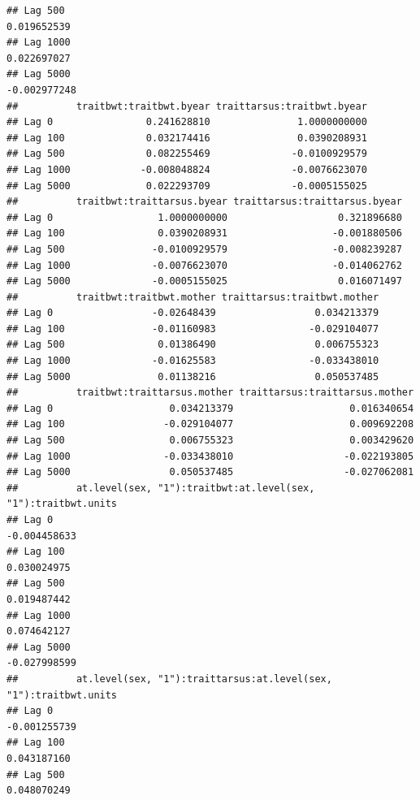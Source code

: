 \documentclass[
  12pt,
]{book}
\begin{document}
\begin{verbatim}
## Lag 500                                                           0.019652539
## Lag 1000                                                          0.022697027
## Lag 5000                                                         -0.002977248
##          traitbwt:traitbwt.byear traittarsus:traitbwt.byear
## Lag 0                0.241628810               1.0000000000
## Lag 100              0.032174416               0.0390208931
## Lag 500              0.082255469              -0.0100929579
## Lag 1000            -0.008048824              -0.0076623070
## Lag 5000             0.022293709              -0.0005155025
##          traitbwt:traittarsus.byear traittarsus:traittarsus.byear
## Lag 0                  1.0000000000                   0.321896680
## Lag 100                0.0390208931                  -0.001880506
## Lag 500               -0.0100929579                  -0.008239287
## Lag 1000              -0.0076623070                  -0.014062762
## Lag 5000              -0.0005155025                   0.016071497
##          traitbwt:traitbwt.mother traittarsus:traitbwt.mother
## Lag 0                 -0.02648439                 0.034213379
## Lag 100               -0.01160983                -0.029104077
## Lag 500                0.01386490                 0.006755323
## Lag 1000              -0.01625583                -0.033438010
## Lag 5000               0.01138216                 0.050537485
##          traitbwt:traittarsus.mother traittarsus:traittarsus.mother
## Lag 0                    0.034213379                    0.016340654
## Lag 100                 -0.029104077                    0.009692208
## Lag 500                  0.006755323                    0.003429620
## Lag 1000                -0.033438010                   -0.022193805
## Lag 5000                 0.050537485                   -0.027062081
##          at.level(sex, "1"):traitbwt:at.level(sex, "1"):traitbwt.units
## Lag 0                                                     -0.004458633
## Lag 100                                                    0.030024975
## Lag 500                                                    0.019487442
## Lag 1000                                                   0.074642127
## Lag 5000                                                  -0.027998599
##          at.level(sex, "1"):traittarsus:at.level(sex, "1"):traitbwt.units
## Lag 0                                                        -0.001255739
## Lag 100                                                       0.043187160
## Lag 500                                                       0.048070249

\end{verbatim}
\end{document}
